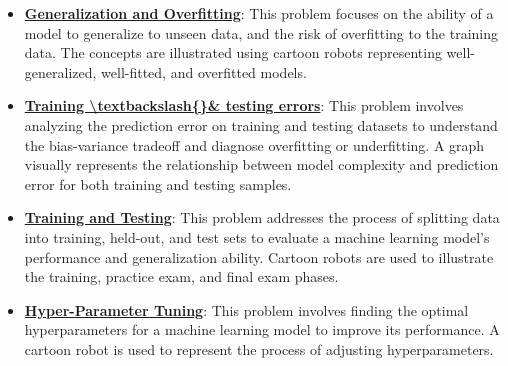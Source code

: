 \documentclass{article}%
\begin{document}
\begin{itemize}[leftmargin=*]%
\item \href{https://purdue.brightspace.com/d2l/common/assets/pdfjs-d2l-dist/1.0.14-legacy/web/viewer.html?file=\%2Fcontent\%2Fenforced\%2F1095467-wl.202510.CS.24300.001\%2F10L1-CrossValidation.pdf\%3Fou\%3D1095467\&lang=en-us\&container=d2l-fileviewer-rendered-pdf\&fullscreen=d2l-fileviewer-rendered-pdf-dialog\&height=667#page=2}{\textbf{Generalization and Overfitting}}: This problem focuses on the ability of a model to generalize to unseen data, and the risk of overfitting to the training data. The concepts are illustrated using cartoon robots representing well-generalized, well-fitted, and overfitted models.%
\item \href{https://purdue.brightspace.com/d2l/common/assets/pdfjs-d2l-dist/1.0.14-legacy/web/viewer.html?file=\%2Fcontent\%2Fenforced\%2F1095467-wl.202510.CS.24300.001\%2F10L1-CrossValidation.pdf\%3Fou\%3D1095467\&lang=en-us\&container=d2l-fileviewer-rendered-pdf\&fullscreen=d2l-fileviewer-rendered-pdf-dialog\&height=667#page=4}{\textbf{Training \textbackslash{}textbackslash\{\}\& testing errors}}: This problem involves analyzing the prediction error on training and testing datasets to understand the bias-variance tradeoff and diagnose overfitting or underfitting. A graph visually represents the relationship between model complexity and prediction error for both training and testing samples.%
\item \href{https://purdue.brightspace.com/d2l/common/assets/pdfjs-d2l-dist/1.0.14-legacy/web/viewer.html?file=\%2Fcontent\%2Fenforced\%2F1095467-wl.202510.CS.24300.001\%2F10L1-CrossValidation.pdf\%3Fou\%3D1095467\&lang=en-us\&container=d2l-fileviewer-rendered-pdf\&fullscreen=d2l-fileviewer-rendered-pdf-dialog\&height=667#page=5}{\textbf{Training and Testing}}: This problem addresses the process of splitting data into training, held-out, and test sets to evaluate a machine learning model's performance and generalization ability. Cartoon robots are used to illustrate the training, practice exam, and final exam phases.%
\item \href{https://purdue.brightspace.com/d2l/common/assets/pdfjs-d2l-dist/1.0.14-legacy/web/viewer.html?file=\%2Fcontent\%2Fenforced\%2F1095467-wl.202510.CS.24300.001\%2F10L1-CrossValidation.pdf\%3Fou\%3D1095467\&lang=en-us\&container=d2l-fileviewer-rendered-pdf\&fullscreen=d2l-fileviewer-rendered-pdf-dialog\&height=667#page=14}{\textbf{Hyper{-}Parameter Tuning}}: This problem involves finding the optimal hyperparameters for a machine learning model to improve its performance. A cartoon robot is used to represent the process of adjusting hyperparameters.%

\end{itemize}
\end{document}
